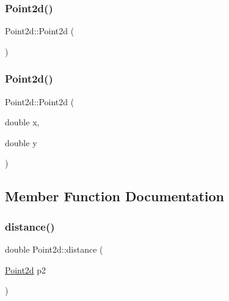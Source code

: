 \subsubsection{\texorpdfstring{Point2d()}{Point2d()}\hspace{0.1cm}{\footnotesize\ttfamily [1/2]}}
{\footnotesize\ttfamily Point2d\+::\+Point2d (\begin{DoxyParamCaption}{ }\end{DoxyParamCaption})\hspace{0.3cm}{\ttfamily [inline]}}

\mbox{\label{class_point2d_a102255af27ab69a9194b2c5e91087bb5}} 
\subsubsection{\texorpdfstring{Point2d()}{Point2d()}\hspace{0.1cm}{\footnotesize\ttfamily [2/2]}}
{\footnotesize\ttfamily Point2d\+::\+Point2d (\begin{DoxyParamCaption}\item[{double}]{x,  }\item[{double}]{y }\end{DoxyParamCaption})\hspace{0.3cm}{\ttfamily [inline]}}



\subsection{Member Function Documentation}
\mbox{\label{class_point2d_a848f2370ad60ab7bc77dd2b7d2e93c6e}} 
\subsubsection{\texorpdfstring{distance()}{distance()}}
{\footnotesize\ttfamily double Point2d\+::distance (\begin{DoxyParamCaption}\item[{\hyperlink{class_point2d}{Point2d}}]{p2 }\end{DoxyParamCaption})}

\mbox{\label{class_point2d_ac1663e897d11ca6f479106b3d8154c83}} 
